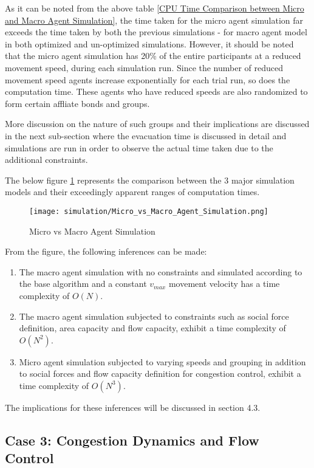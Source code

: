 As it can be noted from the above table \ref{CPU Time Comparison between Micro and Macro Agent Simulation}, the time taken for the micro agent simulation far exceeds the time taken by both the previous simulations - for macro agent model in both optimized and un-optimized simulations. However, it should be noted that the micro agent simulation has 20\% of the entire participants at a reduced movement speed, during each simulation run. Since the number of reduced movement speed agents increase exponentially for each trial run, so does the computation time. These agents who have reduced speeds are also randomized to form certain affliate bonds and groups. 

More discussion on the nature of such groups and their implications are discussed in the next sub-section where the evacuation time is discussed in detail and simulations are run in order to observe the actual time taken due to the additional constraints.

The below figure \ref{Micro vs Macro Agent Simulation} represents the comparison between the 3 major simulation models and their exceedingly apparent ranges of computation times. 

\begin{figure}[H]
  \centering
  \texttt{[image: simulation/Micro\_vs\_Macro\_Agent\_Simulation.png]}
  \caption{Micro vs Macro Agent Simulation}
  \label{Micro vs Macro Agent Simulation}
\end{figure}

From the figure, the following inferences can be made:

\begin{enumerate}
  \item The macro agent simulation with no constraints and simulated according to the base algorithm and a constant $v_{max}$ movement velocity has a time complexity of $O(N)$.
  \item The macro agent simulation subjected to constraints such as social force definition, area capacity and flow capacity, exhibit a time complexity of $O(N^2)$.
  \item Micro agent simulation subjected to varying speeds and grouping in addition to social forces and flow capacity definition for congestion control, exhibit a time complexity of $O(N^3)$.
\end{enumerate}

The implications for these inferences will be discussed in section 4.3.


\subsection{Case 3: Congestion Dynamics and Flow Control}
\label{sec: Case 3: Congestion Dynamics and Flow Control}

